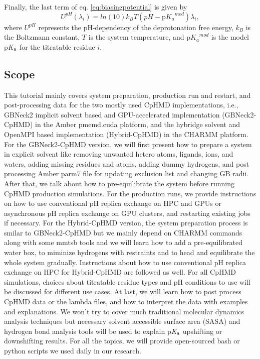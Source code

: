\documentclass[9pt,tutorial]{livecoms}
\newcommand{\pka}{p\textit{K}$_{\rm a}$}
\begin{document}
Finally, the last term of eq. \ref{eq:biasingpotential} is given by
%
\begin{equation}
U^{pH}(\lambda_i)=ln(10)k_BT(pH-\textrm{p}{K_a}^{mod})\lambda_i, 
\label{eq:UpH}
\end{equation}
% 
where $U^{pH}$ represents the pH-dependency of the deprotonation free energy, $k_B$ is the Boltzmann constant, $T$ is the system temperature, and $\textrm{p}{K_a}^{mod}$ is the model {\pka} for the titratable residue $i$.

\subsection{Scope} %
This tutorial mainly covers system preparation, production run and restart, and post-processing data for the two mostly used CpHMD implementations, i.e., GBNeck2 implicit solvent based and GPU-accelerated implementation (GBNeck2-CpHMD) in the Amber pmemd.cuda platform, and the hybridge solvent and OpenMPI based implementation (Hybrid-CpHMD) in the CHARMM platform. For the GBNeck2-CpHMD version, we will first present how to prepare a system in explicit solvent like removing unwanted hetero atoms, ligands, ions, and waters, adding missing residues and atoms, adding dummy hydrogens, and post processing Amber parm7 file for updating exclusion list and changing GB radii. After that, we talk about how to pre-equilibrate the system before running CpHMD production simulations. For the production runs, we provide instructions on how to use conventional pH replica exchange on HPC and GPUs or asynchronous pH replica exchange on GPU clusters, and restarting existing jobs if necessary. For the Hybrid-CpHMD version, the system preparation process is smilar to GBNeck2-CpHMD but we mainly depend on CHARMM commands along with some mmtsb tools and we will learn how to add a pre-equilibrated water box, to miminize hydrogens with restraints and to head and equilibrate the whole system gradually. Instructions about how to use conventional pH replica exchange on HPC for Hybrid-CpHMD are followed as well. For all CpHMD simulations, choices about titratable residue types and pH conditions to use will be discussed for different use cases. At last, we will learn how to post process CpHMD data or the lambda files, and how to interpret the data with examples and explanations. We won't try to cover much traditional molecular dynamics analysis techniques but necessary solvent accessible surface area (SASA) and hydrogen bond analysis tools will be used to explain {\pka} upshifting or downshifting results. For all the topics, we will provide open-sourced bash or python scripts we used daily in our research.
\end{document}
